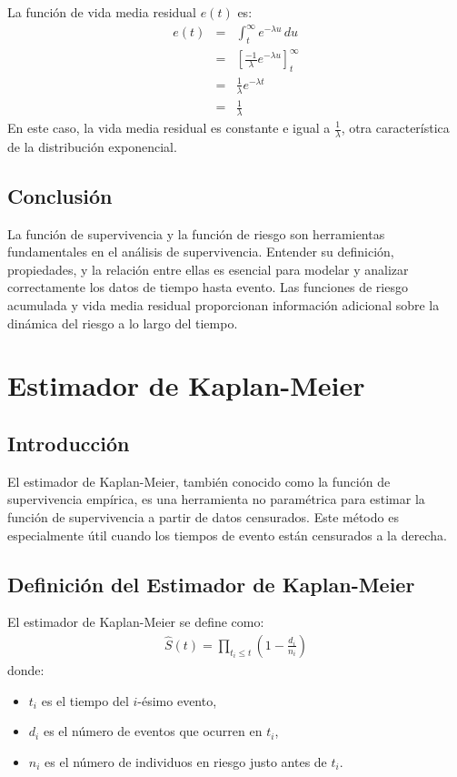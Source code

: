 \documentclass[a4paper]{report} %
\begin{document}
La funci\'on de vida media residual $e(t)$ es:
\begin{eqnarray*}
e(t) &=& \int_t^\infty e^{-\lambda u} \, du \\
     &=& \left[ \frac{-1}{\lambda} e^{-\lambda u} \right]_t^\infty \\
     &=& \frac{1}{\lambda} e^{-\lambda t} \\
     &=& \frac{1}{\lambda}
\end{eqnarray*}
En este caso, la vida media residual es constante e igual a $\frac{1}{\lambda}$, otra caracter\'istica de la distribuci\'on exponencial.

\section{Conclusi\'on}
La funci\'on de supervivencia y la funci\'on de riesgo son herramientas fundamentales en el an\'alisis de supervivencia. Entender su definici\'on, propiedades, y la relaci\'on entre ellas es esencial para modelar y analizar correctamente los datos de tiempo hasta evento. Las funciones de riesgo acumulada y vida media residual proporcionan informaci\'on adicional sobre la din\'amica del riesgo a lo largo del tiempo.



\chapter{Estimador de Kaplan-Meier}

\section{Introducci\'on}
El estimador de Kaplan-Meier, tambi\'en conocido como la funci\'on de supervivencia emp\'irica, es una herramienta no param\'etrica para estimar la funci\'on de supervivencia a partir de datos censurados. Este m\'etodo es especialmente \'util cuando los tiempos de evento est\'an censurados a la derecha.

\section{Definici\'on del Estimador de Kaplan-Meier}
El estimador de Kaplan-Meier se define como:
\begin{eqnarray*}
\hat{S}(t) = \prod_{t_i \leq t} \left(1 - \frac{d_i}{n_i}\right)
\end{eqnarray*}
donde:
\begin{itemize}
    \item $t_i$ es el tiempo del $i$-\'esimo evento,
    \item $d_i$ es el n\'umero de eventos que ocurren en $t_i$,
    \item $n_i$ es el n\'umero de individuos en riesgo justo antes de $t_i$.
\end{itemize}
\end{document}

